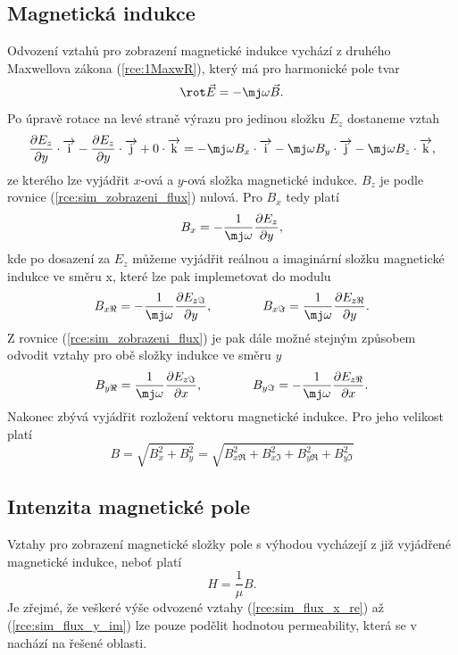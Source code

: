 \subsection*{Magnetická indukce}
Odvození vztahů pro zobrazení magnetické indukce vychází z druhého Maxwellova zákona (\ref{rce:1MaxwR}), který má pro harmonické pole tvar
\begin{displaymath}
	\rot\vec E = -\mj\omega\vec B.
\end{displaymath}
Po úpravě rotace na levé straně výrazu pro jedinou složku $E_z$ dostaneme vztah
\begin{equation}
	\frac{\partial E_z}{\partial y}\cdot\overrightarrow{\mathrm{i}} - \frac{\partial E_z}{\partial y}\cdot\overrightarrow{\mathrm{j}} + 0\cdot\overrightarrow{\mathrm{k}} = -\mj\omega B_x\cdot\overrightarrow{\mathrm{i}} - \mj\omega B_y\cdot\overrightarrow{\mathrm{j}} - \mj\omega B_z\cdot\overrightarrow{\mathrm{k}},
	\label{rce:sim_zobrazeni_flux}
\end{equation}
ze kterého lze vyjádřit $x$-ová a $y$-ová složka magnetické indukce. $B_z$ je podle rovnice (\ref{rce:sim_zobrazeni_flux}) nulová. Pro $B_x$ tedy platí
\begin{displaymath}
	B_x = -\frac{1}{\mj\omega}\frac{\partial E_z}{\partial y},
\end{displaymath}
kde po dosazení za $E_z$ můžeme vyjádřit reálnou a imaginární složku magnetické indukce ve směru x, které lze pak implemetovat do modulu
\begin{equation}
	B_{x\Re} = -\frac{1}{\mj\omega}\frac{\partial E_{z\Im}}{\partial y}, \qquad \qquad B_{x\Im} = \frac{1}{\mj\omega}\frac{\partial E_{z\Re}}{\partial y}.
	\label{rce:sim_flux_x_re}
\end{equation}
Z rovnice (\ref{rce:sim_zobrazeni_flux}) je pak dále možné stejným způsobem odvodit vztahy pro obě složky indukce ve směru $y$
\begin{equation}
	B_{y\Re} = \frac{1}{\mj\omega}\frac{\partial E_{z\Im}}{\partial x}, \qquad \qquad B_{y\Im} = -\frac{1}{\mj\omega}\frac{\partial E_{z\Re}}{\partial x}.
	\label{rce:sim_flux_y_im}
\end{equation}
Nakonec zbývá vyjádřit rozložení vektoru magnetické indukce. Pro jeho velikost platí
\begin{displaymath}
	B = \sqrt{B_{x}^{2} + B_{y}^{2}} = \sqrt{B_{x\Re}^{2} + B_{x\Im}^{2} + B_{y\Re}^{2} + B_{y\Im}^{2}}
\end{displaymath}

\subsection*{Intenzita magnetické pole}
Vztahy pro zobrazení magnetické složky pole s výhodou vycházejí z již vyjádřené magnetické indukce, neboť platí
\begin{displaymath}
H = \frac{1}{\mu} B.
\end{displaymath}
Je zřejmé, že veškeré výše odvozené vztahy (\ref{rce:sim_flux_x_re}) až (\ref{rce:sim_flux_y_im}) lze pouze podělit hodnotou permeability, která se v nachází na řešené oblasti. 

